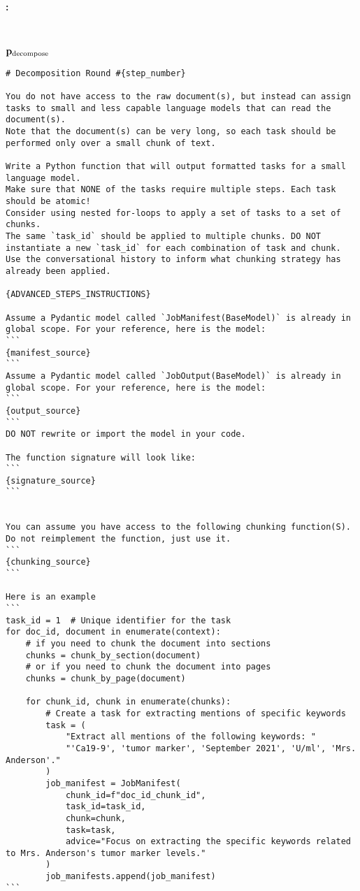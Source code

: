 \paragraph{\system: \qasper} \


\textbf{$\mathbf{p}_{\text{decompose}}$}
\begin{tcolorbox}[colback=gray!10,  width=\textwidth]
\begin{lstlisting}[breaklines]
# Decomposition Round #{step_number}

You do not have access to the raw document(s), but instead can assign tasks to small and less capable language models that can read the document(s).
Note that the document(s) can be very long, so each task should be performed only over a small chunk of text. 

Write a Python function that will output formatted tasks for a small language model.
Make sure that NONE of the tasks require multiple steps. Each task should be atomic! 
Consider using nested for-loops to apply a set of tasks to a set of chunks.
The same `task_id` should be applied to multiple chunks. DO NOT instantiate a new `task_id` for each combination of task and chunk.
Use the conversational history to inform what chunking strategy has already been applied.

{ADVANCED_STEPS_INSTRUCTIONS}

Assume a Pydantic model called `JobManifest(BaseModel)` is already in global scope. For your reference, here is the model:
```
{manifest_source}
```
Assume a Pydantic model called `JobOutput(BaseModel)` is already in global scope. For your reference, here is the model:
```
{output_source}
```
DO NOT rewrite or import the model in your code.

The function signature will look like:
```
{signature_source}
```


You can assume you have access to the following chunking function(S). Do not reimplement the function, just use it.
```
{chunking_source}
```

Here is an example
```
task_id = 1  # Unique identifier for the task
for doc_id, document in enumerate(context):
    # if you need to chunk the document into sections
    chunks = chunk_by_section(document)
    # or if you need to chunk the document into pages
    chunks = chunk_by_page(document)

    for chunk_id, chunk in enumerate(chunks):
        # Create a task for extracting mentions of specific keywords
        task = (
            "Extract all mentions of the following keywords: "
            "'Ca19-9', 'tumor marker', 'September 2021', 'U/ml', 'Mrs. Anderson'."
        )
        job_manifest = JobManifest(
            chunk_id=f"doc_id_chunk_id",
            task_id=task_id,
            chunk=chunk,
            task=task,
            advice="Focus on extracting the specific keywords related to Mrs. Anderson's tumor marker levels."
        )
        job_manifests.append(job_manifest)
```
\end{lstlisting}
\end{tcolorbox}

